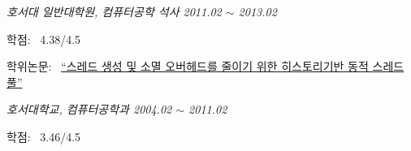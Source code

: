 \documentclass[line,margin]{res}
\begin{document}
\begin{resume}
  {\sl 호서대 일반대학원, 컴퓨터공학 석사 \hfill 2011.02 $\sim$ 2013.02} \vspace{1mm}
  \begin{itemize}
    {\small
    \item[-] 학점: ~4.38/4.5 \vspace{-1mm}
    \item[-] 학위논문: ~\href{http://dlibrary.hoseo.ac.kr/search/DetailView.ax?sid=4&cid=950591}
      {``스레드 생성 및 소멸 오버헤드를 줄이기 위한 히스토리기반 동적 스레드 풀''}}
  \end{itemize}

  {\sl 호서대학교, 컴퓨터공학과 \hfill 2004.02 $\sim$ 2011.02} \vspace{1mm}
  \begin{itemize}
    {\small
    \item[-] 학점: ~3.46/4.5}
  \end{itemize}


\end{resume}

\end{document}
